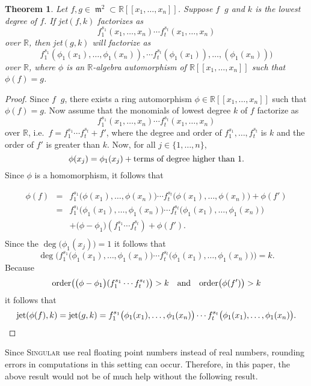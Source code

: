 \documentclass[noend]{amsproc}
\newtheorem{theorem}{Theorem}
\DeclareMathOperator{\requiv}{\overset{r}{\sim}}
\DeclareMathOperator{\m}{\mathfrak{m}}
\begin{document}
\begin{theorem}\label{kjet}
Let $f,g\in \m^2\subset\mathbb R[[x_1,\ldots,x_n]]$. Suppose $f\requiv g$
and $k$
is the lowest degree of $f$. If jet$(f,k)$ factorizes as
\[f_1^{s_1}(x_1,\ldots,x_n)\cdots f_t^{s_t}(x_1,\ldots,x_n)\]
over $\mathbb R$, then jet$(g,k)$ will factorize
as \[f_1^{s_1} (\phi_1(x_1),\ldots,\phi_1(x_n)),\cdots
f_t^{s_t}(\phi_1(x_1)),\ldots,(\phi_1(x_n)))\] over $\mathbb R$, where $\phi$
is an $\mathbb R$-algebra automorphism of $\mathbb R[[x_1,\ldots,x_n]]$
such that $\phi(f)=g$.
\end{theorem}
\begin{proof}
Since $f\requiv g$, there exists a ring automorphism $\phi\in\mathbb
R[[x_1,\ldots,x_n]]$ such that  $\phi(f)=g$. Now
assume that the monomials of lowest degree $k$ of $f$ factorize
as \[f_1^{s_1}(x_1,\ldots,x_n)\cdots f_t^{s_t}(x_1,\ldots,x_n)\] over
$\mathbb R$, i.e.~$f=f_1^{s_1}\cdots f_t^{s_t}+f'$, where the degree and order
of
$f_1^{s_1},\ldots,f_t^{s_t}$ is $k$ and the order of $f'$ is greater than $k$.
Now, for all $j\in\{1,\ldots,n\}$, \[\phi(x_j)=\phi_1(x_j)+\textnormal{terms of
degree higher than $1$}.\] Since $\phi$ is a homomorphism, it follows that

\begin{eqnarray*}
\phi(f)&=&f_1^{s_1}\big(\phi(x_1),\ldots,\phi(x_n)\big)\cdots
f_t^{s_t}\big(\phi(x_1),\ldots,\phi(x_n)\big)+\phi(f')\\
&=&f_1^{s_1}\big(\phi_1(x_1),\ldots,\phi_1(x_n)\big)\cdots
f_t^{s_t}\big(\phi_1(x_1),\ldots,\phi_1(x_n)\big)\\
&&+\big(\phi-\phi_1\big)(f_1^{s_1}\cdots f_t^{s_t})+\phi(f').\\
\end{eqnarray*}
Since the $\deg\big(\phi_1(x_j))=1$ it follows that
\[\deg\big(f_1^{s_1}\big(\phi_1(x_1),\ldots,\phi_1(x_n)\big)\cdots
f_t^{s_t}\big(\phi_1(x_1),\ldots,\phi_1(x_n)\big)\big)=k.\] Because
\[
\textnormal{order}\big(\big(\phi-\phi_1\big)(f_1^{s_1}\cdots f_t^{s_t})\big)>k
\quad\textnormal{and}\quad\textnormal{order}\big(\phi(f')\big)>k
\]
it follows that
\begin{eqnarray*}
\textnormal{jet}(\phi(f),k)=\textnormal{jet}(g,k)
=f_1^{s_1}\big(\phi_1(x_1),\ldots,\phi_1(x_n)\big)\cdots
f_t^{s_t}\big(\phi_1(x_1),\ldots,\phi_1(x_n)\big).
\end{eqnarray*}
\end{proof}

Since \textsc{Singular} use real floating point numbers instead of real
numbers, rounding errors in computations in this setting can
occur. Therefore, in this paper, the above result would not be of much help
without the
following result.
\end{document}
